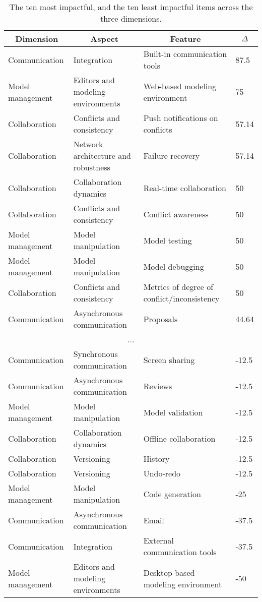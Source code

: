 
  \begin{table*}[]
  \centering
  \notsotiny
  \caption{ The ten most impactful, and the ten least impactful items across the three dimensions.}
\label{tab:top-bottom-delta}
\begin{tabular}{@{}llll@{}}
  \toprule
\multicolumn{1}{c}{\textbf{Dimension}} & \multicolumn{1}{c}{\textbf{Aspect}} & \multicolumn{1}{c}{\textbf{Feature}} & \multicolumn{1}{c}{\textbf{$\Delta$}} \\ 

  \midrule
  Communication & Integration & Built-in communication tools & 87.5 \\ 
Model management & Editors and modeling environments & Web-based modeling environment & 75 \\ 
Collaboration & Conflicts and consistency & Push notifications on conflicts & 57.14 \\ 
Collaboration & Network architecture and robustness & Failure recovery & 57.14 \\ 
Collaboration & Collaboration dynamics & Real-time collaboration & 50 \\ 
Collaboration & Conflicts and consistency & Conflict awareness & 50 \\ 
Model management & Model manipulation & Model testing & 50 \\ 
Model management & Model manipulation & Model debugging & 50 \\ 
Collaboration & Conflicts and consistency & Metrics of degree of conflict/inconsistency & 50 \\ 
Communication & Asynchronous communication & Proposals & 44.64 \\ 
\multicolumn{4}{c}{...} \\ 
Communication & Synchronous communication & Screen sharing & -12.5 \\ 
Communication & Asynchronous communication & Reviews & -12.5 \\ 
Model management & Model manipulation & Model validation & -12.5 \\ 
Collaboration & Collaboration dynamics & Offline collaboration & -12.5 \\ 
Collaboration & Versioning & History & -12.5 \\ 
Collaboration & Versioning & Undo-redo & -12.5 \\ 
Model management & Model manipulation & Code generation & -25 \\ 
Communication & Asynchronous communication & Email & -37.5 \\ 
Communication & Integration & External communication tools & -37.5 \\ 
Model management & Editors and modeling environments & Desktop-based modeling environment & -50 \\ 
\bottomrule
  \end{tabular}%
  \end{table*}